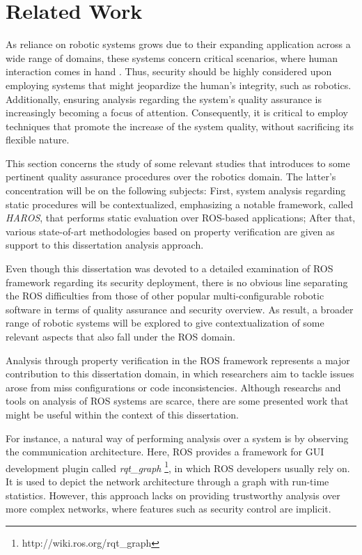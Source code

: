 \section{Related Work}\label{s:relWork-pv}

As reliance on robotic systems grows due to their expanding application across a wide range of domains, these systems concern critical scenarios, where human interaction comes in hand \cite{diluoffo2018robot}. Thus, security should be highly considered upon employing systems that might jeopardize the human's integrity, such as robotics. Additionally, ensuring analysis regarding the system's quality assurance is increasingly becoming a focus of attention. Consequently, it is critical to employ techniques that promote the increase of the system quality, without sacrificing its flexible nature.

This section concerns the study of some relevant studies that introduces to some pertinent quality assurance procedures over the robotics domain. The latter's concentration will be on the following subjects: First, system analysis regarding static procedures will be contextualized, emphasizing a notable framework, called \textit{HAROS}, that performs static evaluation over ROS-based applications; After that, various state-of-art methodologies based on property verification are given as support to this dissertation analysis approach.

Even though this dissertation was devoted to a detailed examination of ROS framework regarding its security deployment, there is no obvious line separating the ROS difficulties from those of other popular multi-configurable robotic software in terms of quality assurance and security overview. As result, a broader range of robotic systems will be explored to give contextualization of some relevant aspects that also fall under the ROS domain.

Analysis through property verification in the ROS framework represents a major contribution to this dissertation domain, in which researchers aim to tackle issues arose from miss configurations or code inconsistencies. Although researchs and tools on analysis of ROS systems are scarce, there are some presented work that might be useful within the context of this dissertation.

For instance, a natural way of performing analysis over a system is by observing the communication architecture. Here, ROS provides a framework for GUI development plugin called \textit{rqt\_graph} \footnote[2]{http://wiki.ros.org/rqt\_graph}, in which ROS developers usually rely on. It is used to depict the network architecture through a graph with run-time statistics. However, this approach lacks on providing trustworthy analysis over more complex networks, where features such as security control are implicit.

